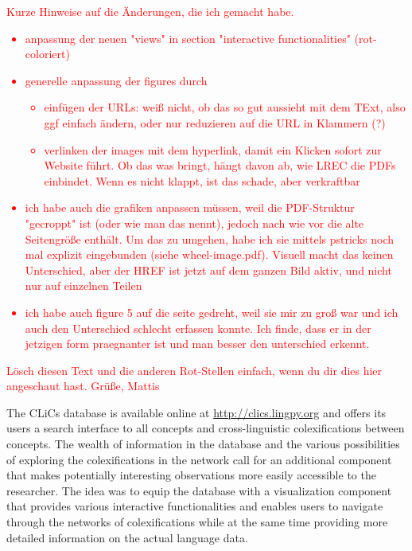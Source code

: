\textcolor{red}{Kurze Hinweise auf die Änderungen, die ich gemacht habe.
\begin{itemize}
    \item anpassung der neuen "views" in section "interactive functionalities" (rot-coloriert)
    \item generelle anpassung der figures durch
	\begin{itemize}
	    \item einfügen der URLs: weiß nicht, ob das so gut aussieht mit dem TExt, also ggf
		einfach ändern, oder nur reduzieren auf die URL in Klammern (?)
	    \item verlinken der images mit dem hyperlink, damit ein Klicken sofort zur Website
		führt. Ob das was bringt, hängt davon ab, wie LREC die PDFs einbindet. Wenn es nicht
		klappt, ist das schade, aber verkraftbar
	\end{itemize}
    \item ich habe auch die grafiken anpassen müssen, weil die PDF-Struktur "gecroppt" ist (oder wie
	man das nennt), jedoch nach wie vor die alte Seitengröße enthält. Um das zu umgehen, habe
	ich sie mittels pstricks noch mal explizit eingebunden (siehe wheel-image.pdf). Visuell
	macht das keinen Unterschied, aber der HREF ist jetzt auf dem ganzen Bild aktiv, und nicht
	nur auf einzelnen Teilen
    \item ich habe auch figure 5 auf die seite gedreht, weil sie mir zu groß war und ich auch den
	Unterschied schlecht erfassen konnte. Ich finde, dass er in der jetzigen form praegnanter
	ist und man besser den unterschied erkennt.
\end{itemize}
Lösch diesen Text und die anderen Rot-Stellen einfach, wenn du dir dies hier angeschaut hast. 
Grüße, Mattis}
The CLiCs database is available online at \url{http://clics.lingpy.org} and offers its users a search interface to all concepts and cross-linguistic colexifications between concepts. The wealth of information in the database and the various possibilities of exploring the colexifications in the network call for an additional component that makes potentially interesting observations more easily accessible to the researcher. The idea was to equip the database with a visualization component that provides various interactive functionalities and enables users to navigate through the networks of colexifications while at the same time providing more detailed information on the actual language data. 
\nocite{Wold2009,Key2007}
